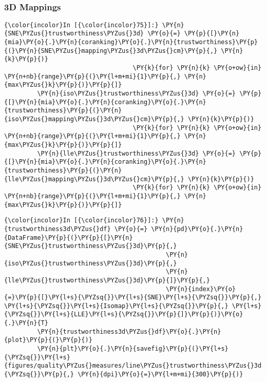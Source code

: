    \begin{center}
    \end{center}
    { \hspace*{\fill} \\}

    \subsubsection{3D Mappings}\label{d-mappings}

    \begin{Verbatim}[commandchars=\\\{\}]
{\color{incolor}In [{\color{incolor}75}]:} \PY{n}{SNE\PYZus{}trustworthiness\PYZus{}3d} \PY{o}{=} \PY{p}{[}\PY{n}{mia}\PY{o}{.}\PY{n}{coranking}\PY{o}{.}\PY{n}{trustworthiness}\PY{p}{(}\PY{n}{SNE\PYZus{}mapping\PYZus{}3d\PYZus{}cm}\PY{p}{,} \PY{n}{k}\PY{p}{)}
                                   \PY{k}{for} \PY{n}{k} \PY{o+ow}{in} \PY{n+nb}{range}\PY{p}{(}\PY{l+m+mi}{1}\PY{p}{,} \PY{n}{max\PYZus{}k}\PY{p}{)}\PY{p}{]}
         \PY{n}{iso\PYZus{}trustworthiness\PYZus{}3d} \PY{o}{=} \PY{p}{[}\PY{n}{mia}\PY{o}{.}\PY{n}{coranking}\PY{o}{.}\PY{n}{trustworthiness}\PY{p}{(}\PY{n}{iso\PYZus{}mapping\PYZus{}3d\PYZus{}cm}\PY{p}{,} \PY{n}{k}\PY{p}{)}
                                   \PY{k}{for} \PY{n}{k} \PY{o+ow}{in} \PY{n+nb}{range}\PY{p}{(}\PY{l+m+mi}{1}\PY{p}{,} \PY{n}{max\PYZus{}k}\PY{p}{)}\PY{p}{]}
         \PY{n}{lle\PYZus{}trustworthiness\PYZus{}3d} \PY{o}{=} \PY{p}{[}\PY{n}{mia}\PY{o}{.}\PY{n}{coranking}\PY{o}{.}\PY{n}{trustworthiness}\PY{p}{(}\PY{n}{lle\PYZus{}mapping\PYZus{}3d\PYZus{}cm}\PY{p}{,} \PY{n}{k}\PY{p}{)}
                                   \PY{k}{for} \PY{n}{k} \PY{o+ow}{in} \PY{n+nb}{range}\PY{p}{(}\PY{l+m+mi}{1}\PY{p}{,} \PY{n}{max\PYZus{}k}\PY{p}{)}\PY{p}{]}
\end{Verbatim}

    \begin{Verbatim}[commandchars=\\\{\}]
{\color{incolor}In [{\color{incolor}76}]:} \PY{n}{trustworthiness3d\PYZus{}df} \PY{o}{=} \PY{n}{pd}\PY{o}{.}\PY{n}{DataFrame}\PY{p}{(}\PY{p}{[}\PY{n}{SNE\PYZus{}trustworthiness\PYZus{}3d}\PY{p}{,}
                                            \PY{n}{iso\PYZus{}trustworthiness\PYZus{}3d}\PY{p}{,}
                                            \PY{n}{lle\PYZus{}trustworthiness\PYZus{}3d}\PY{p}{]}\PY{p}{,}
                                            \PY{n}{index}\PY{o}{=}\PY{p}{[}\PY{l+s}{\PYZsq{}}\PY{l+s}{SNE}\PY{l+s}{\PYZsq{}}\PY{p}{,} \PY{l+s}{\PYZsq{}}\PY{l+s}{Isomap}\PY{l+s}{\PYZsq{}}\PY{p}{,} \PY{l+s}{\PYZsq{}}\PY{l+s}{LLE}\PY{l+s}{\PYZsq{}}\PY{p}{]}\PY{p}{)}\PY{o}{.}\PY{n}{T}
         \PY{n}{trustworthiness3d\PYZus{}df}\PY{o}{.}\PY{n}{plot}\PY{p}{(}\PY{p}{)}
         \PY{n}{plt}\PY{o}{.}\PY{n}{savefig}\PY{p}{(}\PY{l+s}{\PYZsq{}}\PY{l+s}{figures/quality\PYZus{}measures/line\PYZus{}trustworthiness\PYZus{}3d.png}\PY{l+s}{\PYZsq{}}\PY{p}{,} \PY{n}{dpi}\PY{o}{=}\PY{l+m+mi}{300}\PY{p}{)}
\end{Verbatim}

